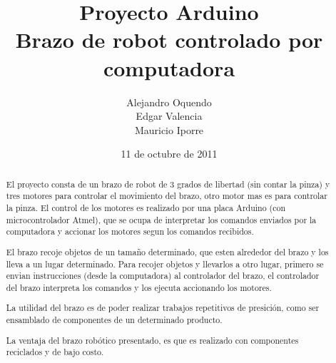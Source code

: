 \documentclass[letterpaper,12pt]{article}
\begin{document}
\date {11 de octubre de 2011}
\author {Alejandro Oquendo \\ Edgar Valencia \\ Mauricio Iporre}
\title{Proyecto Arduino \\ Brazo de robot controlado por computadora}
\maketitle
\begin{abstract}
El proyecto consta de un brazo de robot de 3 grados de libertad (sin
contar la pinza) y tres motores para controlar el movimiento del brazo,
otro motor mas es para controlar la pinza. El control de los motores
es realizado por una placa Arduino (con microcontrolador Atmel), que
se ocupa de interpretar los comandos enviados por la computadora y 
accionar los motores segun los comandos recibidos.

El brazo recoje objetos de un tama\~no determinado, que esten alrededor
del brazo y los lleva a un lugar determinado.
Para recojer objetos y llevarlos a otro lugar, primero se envian
instrucciones (desde la computadora) al controlador del brazo,
el controlador del brazo interpreta los comandos y los ejecuta
accionando los motores.

La utilidad del brazo es de poder realizar trabajos repetitivos de
presici\'on, como ser ensamblado de componentes de un determinado
producto.

La ventaja del brazo rob\'otico presentado, es que es realizado con
componentes reciclados y de bajo costo.

\end{abstract}
\end{document}
